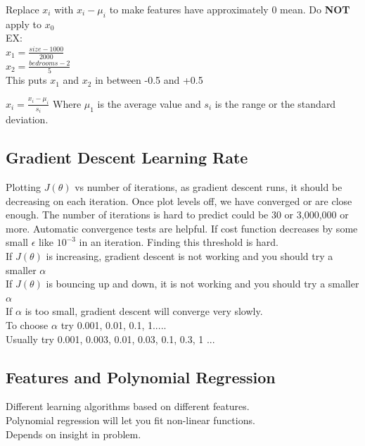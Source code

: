 Replace $x_{i}$ with $x_{i} - \mu_{i}$ to make features have approximately 0 mean.  Do \textbf{NOT} apply to $x_{0}$\\
EX:\\
$x_{1} = \frac{size-1000}{2000}$\\
$x_{2} = \frac{bedrooms - 2}{5}$\\
This puts $x_{1}$ and $x_{2}$ in between -0.5 and +0.5

$x_{i} = \frac{x_{i} - \mu_{i}}{s_{i}}$ Where $\mu_{1}$ is the average value and $s_{i}$ is the range or the standard deviation.

\subsection{Gradient Descent Learning Rate}

Plotting $J(\theta)$ vs number of iterations, as gradient descent runs, it should be decreasing on each iteration.  Once plot levels off, we have converged or are close enough.  The number of iterations is hard to predict could be 30 or 3,000,000 or more.  Automatic convergence tests are helpful.  If cost function decreases by some small $\epsilon$ like $10^{-3}$ in an iteration.  Finding this threshold is hard.\\

If $J(\theta)$ is increasing, gradient descent is not working and you should try a smaller $\alpha$\\

If $J(\theta)$ is bouncing up and down, it is not working and you should try a smaller $\alpha$\\

If $\alpha$ is too small, gradient descent will converge very slowly.\\

To choose $\alpha$ try 0.001, 0.01, 0.1, 1..... \\
Usually try 0.001, 0.003, 0.01, 0.03, 0.1, 0.3, 1 ...\\

\subsection{Features and Polynomial Regression}
Different learning algorithms based on different features.\\
Polynomial regression will let you fit non-linear functions.\\
Depends on insight in problem.\\

